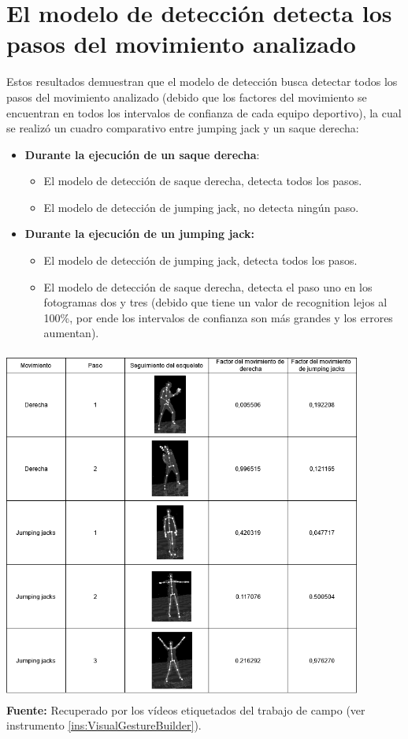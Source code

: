 \section{El modelo de detecci\'on detecta los pasos del movimiento analizado} \label{res:recoMovAna}
Estos resultados demuestran que el modelo de detecci\'on busca detectar todos los pasos del movimiento analizado (debido que los factores del movimiento se encuentran en todos los intervalos de confianza de cada equipo deportivo), la cual se realiz\'o un cuadro comparativo entre jumping jack y un saque derecha:
\begin{itemize}
\item  \textbf{Durante la ejecuci\'on de un saque derecha}: 
\begin{itemize}
\item El modelo de detecci\'on de saque derecha, detecta todos los pasos.
\item El modelo de detecci\'on de jumping jack, no detecta ning\'un paso.
\end{itemize} 
\item  \textbf{Durante la ejecuci\'on de un jumping jack:}
\begin{itemize}
\item  El modelo de detecci\'on de jumping jack, detecta todos los pasos.
\item El modelo de detecci\'on de saque derecha,  detecta el paso uno en los fotogramas dos y tres (debido que tiene un valor de recognition lejos al 100\%, por ende los intervalos de confianza son m\'as grandes y los errores aumentan).
\end{itemize} 
\end{itemize}
\begin{table}[H]
	\caption{Cuadro comparativo entre un jumping jack y saque derecha}
	\label{fig:comparativeMovements}
	\centering
	\includegraphics[width=445px,height=440px]{graphics/resultados/compFM.PNG} \\
	\textbf{Fuente:} Recuperado por los v\'ideos etiquetados del trabajo de campo (ver instrumento \ref{ins:VisualGestureBuilder}).
\end{table}
